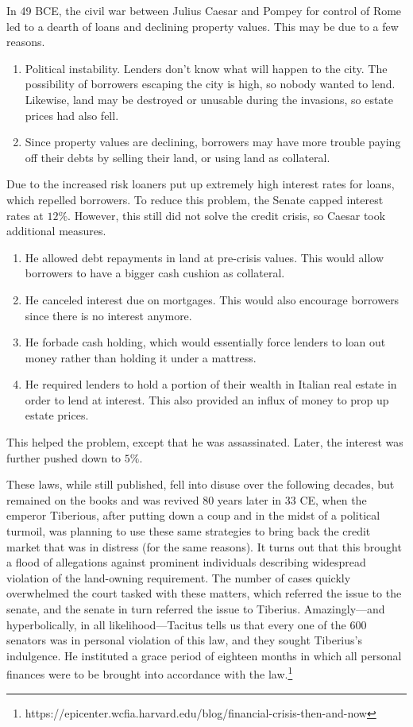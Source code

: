 \documentclass{article}
\begin{document}
    In 49 BCE, the civil war between Julius Caesar and Pompey for control of Rome led to a dearth of loans and declining property values. This may be due to a few reasons. 
    \begin{enumerate}
      \item Political instability. Lenders don't know what will happen to the city. The possibility of borrowers escaping the city is high, so nobody wanted to lend. Likewise, land may be destroyed or unusable during the invasions, so estate prices had also fell. 

      \item Since property values are declining, borrowers may have more trouble paying off their debts by selling their land, or using land as collateral.  
    \end{enumerate}

    Due to the increased risk loaners put up extremely high interest rates for loans, which repelled borrowers. To reduce this problem, the Senate capped interest rates at $12\%$. However, this still did not solve the credit crisis, so Caesar took additional measures. 
    \begin{enumerate}
      \item He allowed debt repayments in land at pre-crisis values. This would allow borrowers to have a bigger cash cushion as collateral. 
      \item He canceled interest due on mortgages. This would also encourage borrowers since there is no interest anymore. 
      \item He forbade cash holding, which would essentially force lenders to loan out money rather than holding it under a mattress. 
      \item He required lenders to hold a portion of their wealth in Italian real estate in order to lend at interest. This also provided an influx of money to prop up estate prices.  
    \end{enumerate}

    This helped the problem, except that he was assassinated. Later, the interest was further pushed down to $5\%$. 

    These laws, while still published, fell into disuse over the following decades, but remained on the books and was revived 80 years later in 33 CE, when the emperor Tiberious, after putting down a coup and in the midst of a political turmoil, was planning to use these same strategies to bring back the credit market that was in distress (for the same reasons). It turns out that this brought a flood of allegations against prominent individuals describing widespread violation of the land-owning requirement. The number of cases quickly overwhelmed the court tasked with these matters, which referred the issue to the senate, and the senate in turn referred the issue to Tiberius. Amazingly—and hyperbolically, in all likelihood—Tacitus tells us that every one of the 600 senators was in personal violation of this law, and they sought Tiberius’s indulgence. He instituted a grace period of eighteen months in which all personal finances were to be brought into accordance with the law.\footnote{https://epicenter.wcfia.harvard.edu/blog/financial-crisis-then-and-now}
\end{document}
